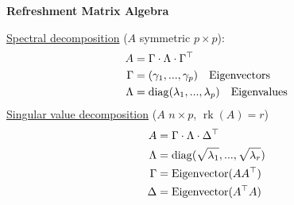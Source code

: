 \documentclass[10pt,landscape,a4paper]{article}
\DeclareMathOperator{\rk}{rk}
\DeclareMathOperator{\diag}{diag}
\DeclareMathOperator{\Eigenvector}{Eigenvector}
\begin{document}
\raggedright
\footnotesize
\begin{multicols*}{4}


\setlength{\columnseprule}{0.1pt}
\setlength{\premulticols}{1pt}
\setlength{\postmulticols}{1pt}
\setlength{\multicolsep}{1pt}
\setlength{\columnsep}{1pt}

\begin{center}
	\normalsize{\textbf{Refreshment Matrix Algebra}} \\
\end{center}
\underline{Spectral decomposition} ($A$ symmetric $p\times p$):
\begin{align}
	A &= \Gamma\cdot\Lambda\cdot\Gamma^\top \notag \\
	\Gamma &= (\gamma_1,...,\gamma_p) \quad\text{Eigenvectors} \notag \\
	\Lambda &= \diag(\lambda_1,...,\lambda_p) \quad\text{Eigenvalues} \notag
\end{align}
\underline{Singular value decomposition} ($A$ $n\times p$, $\rk(A) = r$)
\begin{align}
	A &= \Gamma\cdot\Lambda\cdot\Delta^\top \notag \\
	\Lambda &= \diag(\sqrt{\lambda_1},...,\sqrt{\lambda_r}) \notag \\
	\Gamma &= \Eigenvector(AA^\top) \notag \\
	\Delta &= \Eigenvector(A^\top A) \notag
\end{align}


\end{multicols*}
\end{document}
